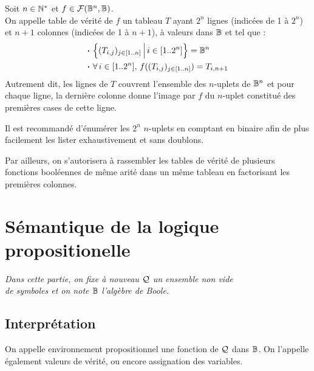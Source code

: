 		\eqskip{3mm}
		\begin{Definition}
			Soit \(n \in \bb{N}^*\) et \(f \in \cal{F} (\bb{B}^n,\bb{B})\). \\[2mm]
			On appelle table de vérité de \(f\) un tableau \(T\) ayant \(2^n\) lignes (indicées de 1 à \(2^n\)) et \(n+1\) colonnes (indicées de 1 à \(n+1\)), à valeurs dans \(\bb{B}\) et tel que :
				\begin{align*}
					& \text{\bdot} \!\left\{(T_{i,j})_{j \in [1..n]} \, \middle| \, i \in [1..2^n] \right\} = \bb{B}^n \\
					& \text{\bdot} \forall \, i \in [1..2^n], \, f((T_{i,j})_{j \in [1..n]}) = T_{i,n+1}
				\end{align*}
			Autrement dit, les lignes de \(T\) couvrent l'ensemble des \(n\)-uplets de \(\bb{B}^n\) et pour chaque ligne, la dernière colonne donne l'image par \(f\) du \(n\)-uplet constitué des premières cases de cette ligne.
		\end{Definition}
		
		\begin{Remarque}
			Il est recommandé d'énumérer les \(2^n\) \(n\)-uplets en comptant en binaire afin de plus facilement les lister exhaustivement et sans doublons.
		\end{Remarque}
		
		\begin{Remarque}
			Par ailleurs, on s'autorisera à rassembler les tables de vérité de plusieurs fonctions booléennes de même arité dans un même tableau en factorisant les premières colonnes.
		\end{Remarque}
		
\section{Sémantique de la logique propositionelle}

	\begin{center}
		\textit{Dans cette partie, on fixe à nouveau \(\cal{Q}\) un ensemble non vide \\ de symboles et on note \(\bb{B}\) l'algèbre de Boole.}
	\end{center}


	\subsection{Interprétation}
		
		\begin{Definition}
			On appelle environnement propositionnel une fonction de \(\cal{Q}\) dans \(\bb{B}\). On l'appelle également valeurs de vérité, ou encore assignation des variables.
		\end{Definition}
		
